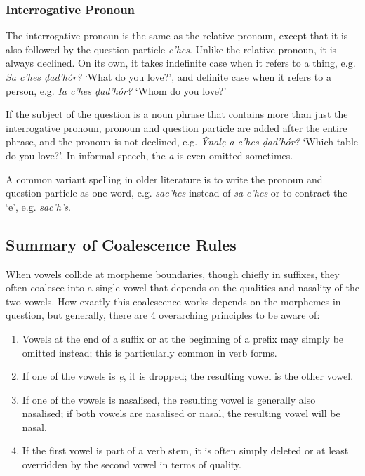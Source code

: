 \documentclass[a4paper, 12pt, twoside, final]{article}
\let \w \textit
\begin{document}
\subsubsection{Interrogative Pronoun}
The interrogative pronoun is the same as the relative pronoun, except that it is also followed by the
question particle \w{c’hes}. Unlike the relative pronoun, it is always declined. On its own, it takes
indefinite case when it refers to a thing, e.g. \w{Sa c’hes ḍad’hór?} ‘What do you love?’, and definite
case when it refers to a person, e.g. \w{Ia c’hes ḍad’hór?} ‘Whom do you love?’

If the subject of the question is a noun phrase that contains more than just the interrogative pronoun,
pronoun and question particle are added after the entire phrase, and the pronoun is not declined, e.g.
\w{Ŷnalẹ a c’hes ḍad’hór?} ‘Which table do you love?’. In informal speech, the \w{a} is even omitted
sometimes.

A common variant spelling in older literature is to write the pronoun and question particle as one
word, e.g. \w{sac’hes} instead of \w{sa c’hes} or to contract the ‘e’, e.g. \w{sac’h’s}.


\subsection{Summary of Coalescence Rules}
When vowels collide at morpheme boundaries, though chiefly in suffixes, they often coalesce into a
single vowel that depends on the qualities and nasality of the two vowels. How exactly this coalescence
works depends on the morphemes in question, but generally, there are 4 overarching principles to be
aware of:
\begin{enumerate}
\item Vowels at the end of a suffix or at the beginning of a prefix may simply be omitted instead;
      this is particularly common in verb forms.
\item If one of the vowels is \w{ẹ}, it is dropped; the resulting vowel is the other vowel.
\item If one of the vowels is nasalised, the resulting vowel is generally also nasalised; if both
      vowels are nasalised or nasal, the resulting vowel will be nasal.
\item If the first vowel is part of a verb stem, it is often simply deleted or at least overridden
      by the second vowel in terms of quality.
\end{enumerate}
\end{document}
